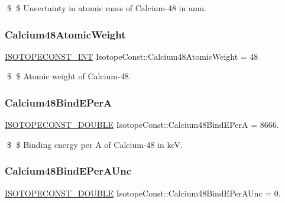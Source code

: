 \$ \$ Uncertainty in atomic mass of Calcium-\/48 in amu. \mbox{\label{group___isotope_const-_calcium-_ca48_ga18753ea168ab0a648b8f35b602c34cc5}} 
\subsubsection{\texorpdfstring{Calcium48\+Atomic\+Weight}{Calcium48AtomicWeight}}
{\footnotesize\ttfamily \mbox{\hyperlink{group___isotope_const-_macros_ga5f18360b3e99483a35c32d789e62621c}{I\+S\+O\+T\+O\+P\+E\+C\+O\+N\+S\+T\+\_\+\+I\+NT}} Isotope\+Const\+::\+Calcium48\+Atomic\+Weight = 48}

\$ \$ Atomic weight of Calcium-\/48. \mbox{\label{group___isotope_const-_calcium-_ca48_gafa6a2d848987e9651114ca495605da86}} 
\subsubsection{\texorpdfstring{Calcium48\+Bind\+E\+PerA}{Calcium48BindEPerA}}
{\footnotesize\ttfamily \mbox{\hyperlink{group___isotope_const-_macros_ga8f45a7272ce02c0b4c65c44636ed719a}{I\+S\+O\+T\+O\+P\+E\+C\+O\+N\+S\+T\+\_\+\+D\+O\+U\+B\+LE}} Isotope\+Const\+::\+Calcium48\+Bind\+E\+PerA = 8666.}

\$ \$ Binding energy per A of Calcium-\/48 in keV. \mbox{\label{group___isotope_const-_calcium-_ca48_gab42bb4ac5d3f055ba2c08d576355627b}} 
\subsubsection{\texorpdfstring{Calcium48\+Bind\+E\+Per\+A\+Unc}{Calcium48BindEPerAUnc}}
{\footnotesize\ttfamily \mbox{\hyperlink{group___isotope_const-_macros_ga8f45a7272ce02c0b4c65c44636ed719a}{I\+S\+O\+T\+O\+P\+E\+C\+O\+N\+S\+T\+\_\+\+D\+O\+U\+B\+LE}} Isotope\+Const\+::\+Calcium48\+Bind\+E\+Per\+A\+Unc = 0.}


